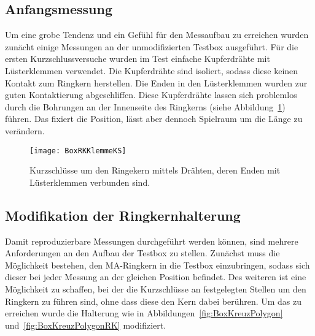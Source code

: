 \subsection{Anfangsmessung}
Um eine grobe Tendenz und ein Gef\"uhl f\"ur den Messaufbau zu erreichen wurden zun\"acht einige Messungen an der unmodifizierten Testbox ausgef\"uhrt. 
F\"ur die ersten Kurzschlussversuche wurden im Test einfache Kupferdr\"ahte mit L\"usterklemmen verwendet. Die Kupferdr\"ahte sind isoliert, sodass diese keinen Kontakt zum Ringkern herstellen. Die Enden in den Lüsterklemmen wurden zur guten Kontaktierung abgeschliffen. Diese Kupferdr\"ahte lassen sich problemlos durch die Bohrungen an der Innenseite des Ringkerns (siehe Abbildung~\ref{fig:innenKern}) f\"uhren. Das fixiert die Position, l\"asst aber dennoch Spielraum um die L\"ange zu ver\"andern.
\par
\begin{figure}[htb]
		\centering
		\texttt{[image: BoxRKKlemmeKS]}
		\caption{Kurzschl\"usse um den Ringekern mittels Dr\"ahten, deren Enden mit L\"usterklemmen verbunden sind.}
		\label{fig:innenKern}
\end{figure}

\newpage



\subsection{Modifikation der Ringkernhalterung}
Damit reproduzierbare Messungen durchgef\"uhrt werden k\"onnen, sind mehrere Anforderungen an den Aufbau der Testbox zu stellen. Zun\"achst muss die M\"oglichkeit bestehen, den MA-Ringkern in die Testbox einzubringen, sodass sich dieser bei jeder Messung an der gleichen Position befindet. Des weiteren ist eine M\"oglichkeit zu schaffen, bei der die Kurzschl\"usse an festgelegten  Stellen um den Ringkern zu f\"uhren sind, ohne dass diese den Kern dabei ber\"uhren. Um das zu erreichen wurde die Halterung wie in Abbildungen~\ref{fig:BoxKreuzPolygon} und~\ref{fig:BoxKreuzPolygonRK} modifiziert.




